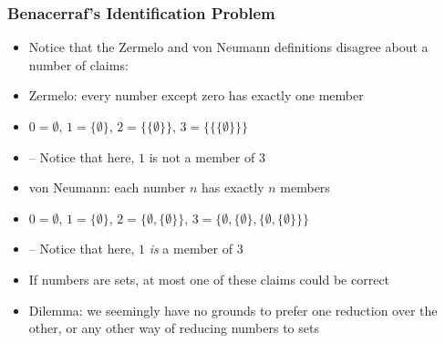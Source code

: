 \begin{frame}
\frametitle{Benacerraf's Identification Problem}

\begin{itemize}[<+->]

\item Notice that the Zermelo and von Neumann definitions disagree about a number of claims:

\item Zermelo: every number except zero has exactly one member

\item[] $0 = \emptyset$, $1 = \{\emptyset\}$, $2 = \{ \{ \emptyset \} \}$, $3 = \{ \{ \{ \emptyset \} \} \}$
\item[] -- Notice that here, $1$ is not a member of $3$

\item von Neumann: each number $n$ has exactly $n$ members
\item[] $0 = \emptyset$, $1 = \{\emptyset\}$, $2 = \{\emptyset, \{\emptyset\} \}$, $3 = \{\emptyset, \{\emptyset\}, \{\emptyset, \{\emptyset\} \} \}$
\item[] -- Notice that here, $1$ \textit{is} a member of $3$

\item If numbers are sets, at most one of these claims could be correct 

\item Dilemma: we seemingly have no grounds to prefer one reduction over the other, or any other way of reducing numbers to sets  

\end{itemize}
\end{frame}

